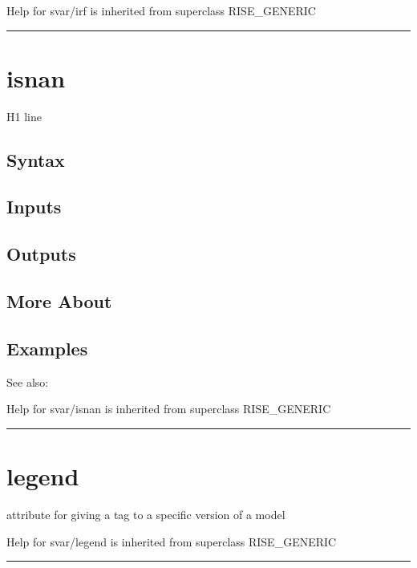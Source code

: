 \documentclass[letterpaper,10pt,english]{sphinxmanual}
\begin{document}
Help for svar/irf is inherited from superclass RISE\_GENERIC


\bigskip\hrule{}\bigskip



\section{isnan}
\label{classes/models/@svar/svar:isnan}\label{classes/models/@svar/svar:id42}
H1 line


\subsection{Syntax}
\label{classes/models/@svar/svar:id43}

\subsection{Inputs}
\label{classes/models/@svar/svar:id44}

\subsection{Outputs}
\label{classes/models/@svar/svar:id45}

\subsection{More About}
\label{classes/models/@svar/svar:id46}

\subsection{Examples}
\label{classes/models/@svar/svar:id47}
See also:

Help for svar/isnan is inherited from superclass RISE\_GENERIC


\bigskip\hrule{}\bigskip



\section{legend}
\label{classes/models/@svar/svar:legend}\label{classes/models/@svar/svar:id48}
attribute for giving a tag to a specific version of a model

Help for svar/legend is inherited from superclass RISE\_GENERIC


\bigskip\hrule{}\bigskip
\end{document}
